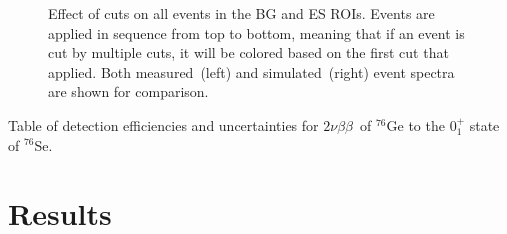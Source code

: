 \documentclass[notitlepage,rmp,aps,10pt]{revtex4-1}
\newcommand{\tnbb}{${2 \nu \beta \beta}$}
\newcommand{\iso}[2]{$^{#1}$#2}
\newcommand{\Ge}[1]{\iso{#1}{Ge}}
\newcommand{\Se}[1]{\iso{#1}{Se}}
\newcommand{\SP}[3]{$#1^{#2}_{#3}$}
\begin{document}
\begin{figure}
  \centering
  \caption[Effect of data cuts on ROI events in measured and simulated data]{\label{fig:cutsroi}
    Effect of cuts on all events in the BG and ES ROIs. Events are applied in sequence from top to bottom, meaning that if an event is cut by multiple cuts, it will be colored based on the first cut that applied. Both measured~(left) and simulated~(right) event spectra are shown for comparison.
  }
\end{figure}

\begin{table}
  \centering
  
  \caption[Detection efficiency summary for \tnbb\ to the \SP{0}{+}{1} state of \Se{76}]{\label{tab:bgcutstable}
    Table of detection efficiencies and uncertainties for \tnbb\ of \Ge{76} to the \SP{0}{+}{1} state of \Se{76}.
  }
\end{table}

\section{Results}
\end{document}
